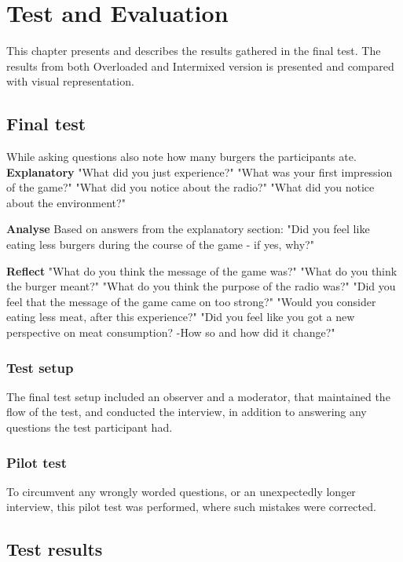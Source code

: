 \chapter{Test and Evaluation}
This chapter presents and describes the results gathered in the final test. The results from both Overloaded and Intermixed version is presented and compared with visual representation.

\section{Final test}
While asking questions also note how many burgers the participants ate.
\textbf{Explanatory}
    "What did you just experience?"
    "What was your first impression of the game?"
    "What did you notice about the radio?"
    "What did you notice about the environment?"
    

\textbf{Analyse}
Based on answers from the explanatory section:
    "Did you feel like eating less burgers during the course of the game - if yes, why?"
    

\textbf{Reflect}
    "What do you think the message of the game was?"
    "What do you think the burger meant?"
    "What do you think the purpose of the radio was?"
    "Did you feel that the message of the game came on too strong?"
    "Would you consider eating less meat, after this experience?"
    "Did you feel like you got a new perspective on meat consumption? -How so and how did it change?"

    
\subsection{Test setup}
    The final test setup included an observer and a moderator, that maintained the flow of the test, and conducted the interview, in addition to answering any questions the test participant had.
    
\subsection{Pilot test}
    To circumvent any wrongly worded questions, or an unexpectedly longer interview, this pilot test was performed, where such mistakes were corrected.

\section{Test results}